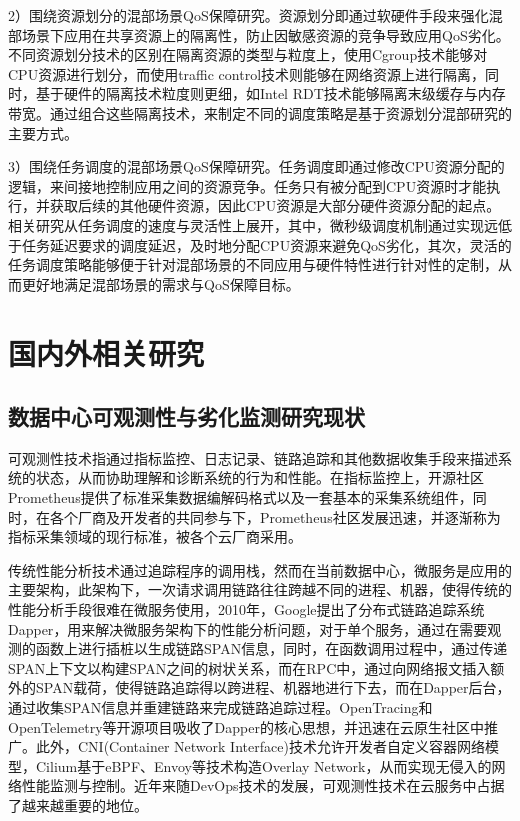 2）围绕资源划分的混部场景QoS保障研究。资源划分即通过软硬件手段来强化混部场景下应用在共享资源上的隔离性，防止因敏感资源的竞争导致应用QoS劣化。不同资源划分技术的区别在隔离资源的类型与粒度上，使用Cgroup技术能够对CPU资源进行划分，而使用traffic control技术\citep{hubert2002linux}则能够在网络资源上进行隔离，同时，基于硬件的隔离技术粒度则更细，如Intel RDT技术\citep{guide2011intel}能够隔离末级缓存与内存带宽。通过组合这些隔离技术，来制定不同的调度策略是基于资源划分混部研究的主要方式。

3）围绕任务调度的混部场景QoS保障研究。任务调度即通过修改CPU资源分配的逻辑，来间接地控制应用之间的资源竞争。任务只有被分配到CPU资源时才能执行，并获取后续的其他硬件资源，因此CPU资源是大部分硬件资源分配的起点。相关研究从任务调度的速度与灵活性上展开，其中，微秒级调度机制通过实现远低于任务延迟要求的调度延迟，及时地分配CPU资源来避免QoS劣化，其次，灵活的任务调度策略能够便于针对混部场景的不同应用与硬件特性进行针对性的定制，从而更好地满足混部场景的需求与QoS保障目标。

\section{国内外相关研究}

\subsection{数据中心可观测性与劣化监测研究现状}


可观测性技术指通过指标监控、日志记录、链路追踪和其他数据收集手段来描述系统的状态，从而协助理解和诊断系统的行为和性能。在指标监控上，开源社区Prometheus\citep{brazil2018prometheus}提供了标准采集数据编解码格式以及一套基本的采集系统组件，同时，在各个厂商及开发者的共同参与下，Prometheus社区发展迅速，并逐渐称为指标采集领域的现行标准，被各个云厂商采用。

传统性能分析技术通过追踪程序的调用栈，然而在当前数据中心，微服务是应用的主要架构，此架构下，一次请求调用链路往往跨越不同的进程、机器，使得传统的性能分析手段很难在微服务使用，2010年，Google提出了分布式链路追踪系统Dapper\citep{sigelman2010dapper}，用来解决微服务架构下的性能分析问题，对于单个服务，通过在需要观测的函数上进行插桩以生成链路SPAN信息，同时，在函数调用过程中，通过传递SPAN上下文以构建SPAN之间的树状关系，而在RPC中，通过向网络报文插入额外的SPAN载荷，使得链路追踪得以跨进程、机器地进行下去，而在Dapper后台，通过收集SPAN信息并重建链路来完成链路追踪过程。OpenTracing和OpenTelemetry等开源项目吸收了Dapper的核心思想，并迅速在云原生社区中推广。此外，CNI(Container Network Interface)\citep{k8s-network-plugins}技术允许开发者自定义容器网络模型，Cilium\citep{cilium}基于eBPF、Envoy等技术\citep{ebpf,envoyproxy}构造Overlay Network，从而实现无侵入的网络性能监测与控制。近年来随DevOps技术的发展，可观测性技术在云服务中占据了越来越重要的地位。

